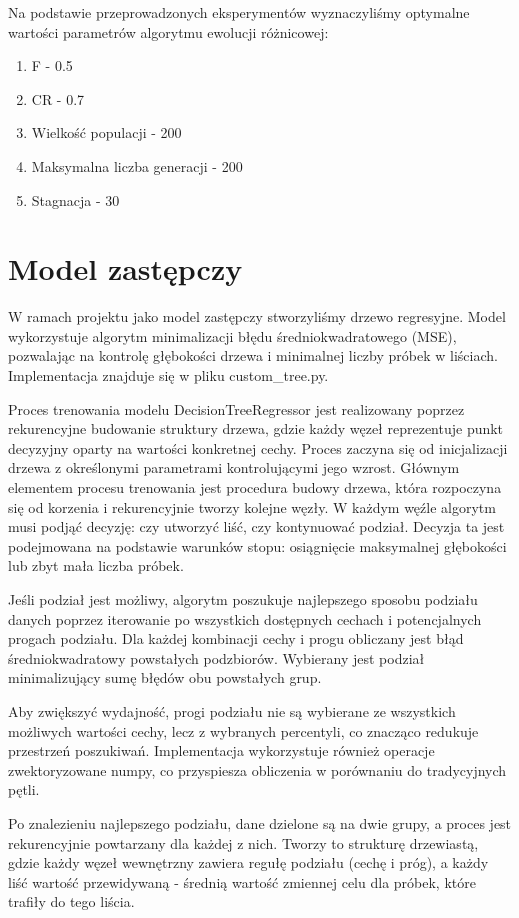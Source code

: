 \documentclass{article}
\begin{document}
Na podstawie przeprowadzonych eksperymentów wyznaczyliśmy optymalne wartości parametrów algorytmu ewolucji różnicowej:
\begin{enumerate}
    \item F - 0.5
    \item CR - 0.7
    \item Wielkość populacji - 200
    \item Maksymalna liczba generacji - 200
    \item Stagnacja - 30
\end{enumerate}


\section{Model zastępczy}
W ramach projektu jako model zastępczy stworzyliśmy drzewo regresyjne. Model wykorzystuje algorytm minimalizacji błędu średniokwadratowego (MSE), pozwalając na kontrolę głębokości drzewa i minimalnej liczby próbek w liściach. Implementacja znajduje się w pliku custom\_tree.py.

Proces trenowania modelu DecisionTreeRegressor jest realizowany poprzez rekurencyjne budowanie struktury drzewa, gdzie każdy węzeł reprezentuje punkt decyzyjny oparty na wartości konkretnej cechy.  Proces zaczyna się od inicjalizacji drzewa z określonymi parametrami kontrolującymi jego wzrost. Głównym elementem procesu trenowania jest procedura budowy drzewa, która rozpoczyna się od korzenia i rekurencyjnie tworzy kolejne węzły. W każdym węźle algorytm musi podjąć decyzję: czy utworzyć liść, czy kontynuować podział. Decyzja ta jest podejmowana na podstawie warunków stopu: osiągnięcie maksymalnej głębokości lub zbyt mała liczba próbek.

Jeśli podział jest możliwy, algorytm poszukuje najlepszego sposobu podziału danych poprzez iterowanie po wszystkich dostępnych cechach i potencjalnych progach podziału. Dla każdej kombinacji cechy i progu obliczany jest błąd średniokwadratowy powstałych podzbiorów. Wybierany jest podział minimalizujący sumę błędów obu powstałych grup.

Aby zwiększyć wydajność, progi podziału nie są wybierane ze wszystkich możliwych wartości cechy, lecz z wybranych percentyli, co znacząco redukuje przestrzeń poszukiwań. Implementacja wykorzystuje również operacje zwektoryzowane numpy, co przyspiesza obliczenia w porównaniu do tradycyjnych pętli.

Po znalezieniu najlepszego podziału, dane dzielone są na dwie grupy, a proces jest rekurencyjnie powtarzany dla każdej z nich. Tworzy to strukturę drzewiastą, gdzie każdy węzeł wewnętrzny zawiera regułę podziału (cechę i próg), a każdy liść wartość przewidywaną - średnią wartość zmiennej celu dla próbek, które trafiły do tego liścia.
\end{document}
